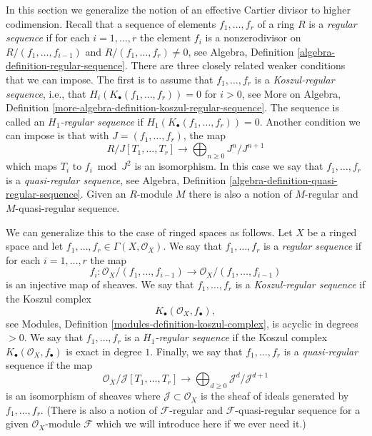 \noindent
In this section we generalize the notion of an effective Cartier divisor
to higher codimension. Recall that a sequence of elements
$f_1, \ldots, f_r$ of a ring $R$ is a {\it regular sequence} if for each
$i = 1, \ldots, r$ the element $f_i$ is a nonzerodivisor on
$R/(f_1, \ldots, f_{i - 1})$ and $R/(f_1, \ldots, f_r) \not = 0$, see
Algebra, Definition \ref{algebra-definition-regular-sequence}.
There are three closely related weaker conditions that we can impose.
The first is to assume that $f_1, \ldots, f_r$ is a {\it Koszul-regular
sequence}, i.e., that $H_i(K_\bullet(f_1, \ldots, f_r)) = 0$ for $i > 0$, see
More on Algebra,
Definition \ref{more-algebra-definition-koszul-regular-sequence}.
The sequence is called an {\it $H_1$-regular sequence} if
$H_1(K_\bullet(f_1, \ldots, f_r)) = 0$. Another condition we can impose
is that with $J = (f_1, \ldots, f_r)$, the map
$$
R/J[T_1, \ldots, T_r]
\longrightarrow
\bigoplus\nolimits_{n \geq 0}
J^n/J^{n + 1}
$$
which maps $T_i$ to $f_i \bmod J^2$ is an isomorphism. In this case
we say that $f_1, \ldots, f_r$ is a
{\it quasi-regular sequence}, see
Algebra, Definition \ref{algebra-definition-quasi-regular-sequence}.
Given an $R$-module $M$ there is also a notion of $M$-regular and
$M$-quasi-regular sequence.

\medskip\noindent
We can generalize this to the case of ringed spaces as follows.
Let $X$ be a ringed space and let
$f_1, \ldots, f_r \in \Gamma(X, \mathcal{O}_X)$.
We say that $f_1, \ldots, f_r$ is a {\it regular sequence} if
for each $i = 1, \ldots, r$ the map
\begin{equation}
\label{equation-map-regular}
f_i :
\mathcal{O}_X/(f_1, \ldots, f_{i - 1})
\longrightarrow
\mathcal{O}_X/(f_1, \ldots, f_{i - 1})
\end{equation}
is an injective map of sheaves. We say that $f_1, \ldots, f_r$ is a
{\it Koszul-regular sequence} if the Koszul complex
\begin{equation}
\label{equation-koszul}
K_\bullet(\mathcal{O}_X, f_\bullet),
\end{equation}
see
Modules, Definition \ref{modules-definition-koszul-complex},
is acyclic in degrees $> 0$. We say that $f_1, \ldots, f_r$ is a
{\it $H_1$-regular sequence} if the Koszul complex
$K_\bullet(\mathcal{O}_X, f_\bullet)$ is exact in degree $1$. Finally,
we say that $f_1, \ldots, f_r$ is a
{\it quasi-regular} sequence if the map
\begin{equation}
\label{equation-map-quasi-regular}
\mathcal{O}_X/\mathcal{J}[T_1, \ldots, T_r]
\longrightarrow
\bigoplus\nolimits_{d \geq 0} \mathcal{J}^d/\mathcal{J}^{d + 1}
\end{equation}
is an isomorphism of sheaves where $\mathcal{J} \subset \mathcal{O}_X$
is the sheaf of ideals generated by $f_1, \ldots, f_r$. (There is also
a notion of $\mathcal{F}$-regular and $\mathcal{F}$-quasi-regular sequence
for a given $\mathcal{O}_X$-module $\mathcal{F}$ which we will introduce
here if we ever need it.)

